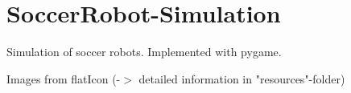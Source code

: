 \chapter{Soccer\+Robot-\/\+Simulation}
\hypertarget{md__r_e_a_d_m_e}{}\label{md__r_e_a_d_m_e}
\label{md__r_e_a_d_m_e_autotoc_md0}%
%


Simulation of soccer robots. Implemented with pygame.

Images from flat\+Icon (-\/\texorpdfstring{$>$}{>} detailed information in "{}resources"{}-\/folder) 
